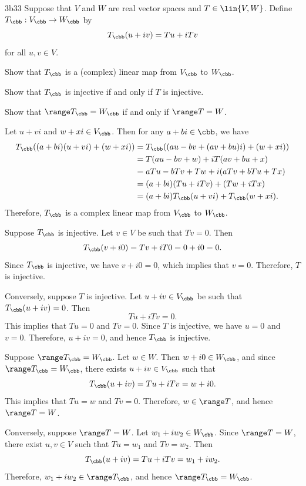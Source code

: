 \begin{exercise}{3b33}
    Suppose that $V$ and $W$ are real vector spaces and $T \in \lin{V, W}$.
	Define $T_\cbb: V_\cbb \to W_\cbb$ by
    \[
    	T_\cbb(u + iv) = Tu + iTv
    \]
    for all $u, v \in V$.
    \begin{subexercises}
        \item Show that $T_\cbb$ is a (complex) linear map from $V_\cbb$ to $W_\cbb$.
        \item Show that $T_\cbb$ is injective if and only if $T$ is injective.
        \item Show that $\range T_\cbb = W_\cbb$ if and only if $\range T = W$.
    \end{subexercises}
    
\end{exercise}

\begin{solenum}
    \item Let $u + vi$ and $w + xi \in V_\cbb$.
	Then for any $a + bi \in \cbb$, we have
    \begin{align*}
        T_\cbb((a + bi)(u + vi) + (w + xi)) & = T_\cbb((au - bv + (av + bu)i) + (w + xi)) \\
        & = T(au - bv + w) + iT(av + bu + x) \\
        & = aTu - bTv + Tw + i(aTv + bTu + Tx) \\
        & = (a + bi)(Tu + iTv) + (Tw + iTx) \\
        & = (a + bi)T_\cbb(u + vi) + T_\cbb(w + xi).
    \end{align*}
    Therefore, $T_\cbb$ is a complex linear map from $V_\cbb$ to $W_\cbb$.
    \item Suppose $T_\cbb$ is injective.
	Let $v \in V$ be such that $Tv = 0$.
	Then
    \[
    	T_\cbb(v + i0) = Tv + iT0 = 0 + i0 = 0.
    \]
    Since $T_\cbb$ is injective, we have $v + i0 = 0$, which implies that $v = 0$.
	Therefore, $T$ is injective.

    Conversely, suppose $T$ is injective.
	Let $u + iv \in V_\cbb$ be such that $T_\cbb(u + iv) = 0$.
	Then
    \[
    	Tu + iTv = 0.
    \]
    This implies that $Tu = 0$ and $Tv = 0$.
	Since $T$ is injective, we have $u = 0$ and $v = 0$.
	Therefore, $u + iv = 0$, and hence $T_\cbb$ is injective.
    \item Suppose $\range T_\cbb = W_\cbb$.
	Let $w \in W$.
	Then $w + i0 \in W_\cbb$, and since $\range T_\cbb = W_\cbb$, there exists $u + iv \in V_\cbb$ such that
    \[
    	T_\cbb(u + iv) = Tu + iTv = w + i0.
    \]
    This implies that $Tu = w$ and $Tv = 0$.
	Therefore, $w \in \range T$, and hence $\range T = W$.

    Conversely, suppose $\range T = W$.
	Let $w_1 + iw_2 \in W_\cbb$.
	Since $\range T = W$, there exist $u, v \in V$ such that $Tu = w_1$ and $Tv = w_2$.
	Then
    \[
    	T_\cbb(u + iv) = Tu + iTv = w_1 + iw_2.
    \]
    Therefore, $w_1 + iw_2 \in \range T_\cbb$, and hence $\range T_\cbb = W_\cbb$.
\end{solenum}
